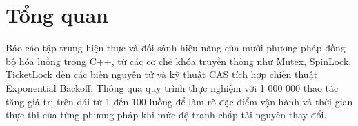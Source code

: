 \section{Tổng quan}

Báo cáo tập trung hiện thực và đối sánh hiệu năng của mười phương pháp đồng bộ hóa luồng trong C++, từ các cơ chế khóa truyền thống như Mutex, SpinLock, TicketLock đến các biến nguyên tử và kỹ thuật CAS tích hợp chiến thuật Exponential Backoff. Thông qua quy trình thực nghiệm với 1 000 000 thao tác tăng giá trị trên dải từ 1 đến 100 luồng để làm rõ đặc điểm vận hành và thời gian thực thi của từng phương pháp khi mức độ tranh chấp tài nguyên thay đổi.